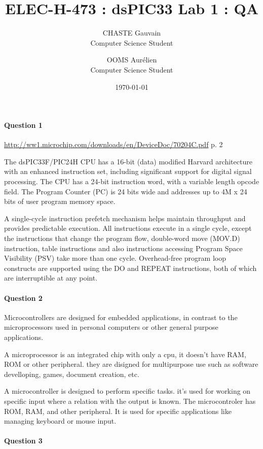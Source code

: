 \documentclass[10pt]{article}
\title{ELEC-H-473 : dsPIC33 Lab 1 : QA}
\author{CHASTE Gauvain  \\
	Computer Science Student \\
	\and 
	OOMS Aurélien \\
	Computer Science Student \\
}
\date{\today}
\begin{document}
\maketitle

\paragraph{Question 1}
\url{http://ww1.microchip.com/downloads/en/DeviceDoc/70204C.pdf} p. 2

The dsPIC33F/PIC24H CPU has a 16-bit (data) modified Harvard architecture with an 
enhanced instruction set, including significant support for digital signal processing. The CPU 
has a 24-bit instruction word, with a variable length opcode field. The Program Counter (PC) is 
24 bits wide and addresses up to 4M x 24 bits of user program memory space.

A single-cycle instruction prefetch mechanism helps maintain throughput and provides 
predictable execution. All instructions execute in a single cycle, except the instructions that 
change the program flow, double-word move (MOV.D) instruction, table instructions and also 
instructions accessing Program Space Visibility (PSV) take more than one cycle. Overhead-free 
program loop constructs are supported using the DO and REPEAT instructions, both of which are 
interruptible at any point.


\paragraph{Question 2}

Microcontrollers are designed for embedded applications, in contrast to the microprocessors used in personal computers or other general purpose applications.

A microprocessor is an integrated chip with only a cpu, it doesn't have RAM, ROM or other peripheral. they are disigned for multipurpose use such as software develloping, games, document creation, etc.

A microcontroller is designed to perform specific tasks. it's used for working on specific input where a relation with the output is known. The microcontroler has ROM, RAM, and other peripheral. It is used for specific applications like managing keyboard or mouse input.


\paragraph{Question 3}
\end{document}
